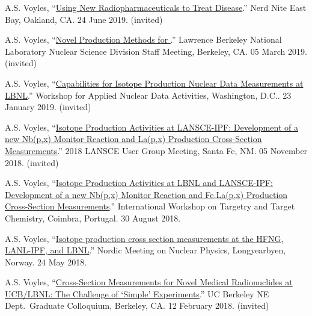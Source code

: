 \begin{bibsection}
\item A.S. Voyles, \enquote{\href{https://eastbay.nerdnite.com/nerd-nite-624-apollo-11-recovery-oakland-art-deco-radiopharmaceuticals/}{Using New Radiopharmaceuticals to Treat Disease}.} Nerd Nite East Bay, Oakland, CA. 24 June 2019. (invited)

\item A.S. Voyles, \enquote{\href{https://conferences.lbl.gov/event/188/}{Novel Production Methods for }.} Lawrence Berkeley National Laboratory Nuclear Science Division Staff Meeting, Berkeley, CA. 05 March 2019. (invited)

\item A.S. Voyles, \enquote{\href{https://conferences.lbl.gov/event/198/}{Capabilities for Isotope Production Nuclear Data Measurements at LBNL}.} Workshop for Applied Nuclear Data Activities, Washington, D.C.. 23 January 2019. (invited)

\item A.S. Voyles, \enquote{\href{https://lansce.lanl.gov/lug2018.php}{Isotope Production Activities at LANSCE-IPF: Development of a new Nb(p,x) Monitor Reaction and La(p,x) Production Cross-Section Measurements}.} 2018 LANSCE User Group Meeting, Santa Fe, NM. 05 November 2018. (invited)

\item A.S. Voyles, \enquote{\href{https://slideslive.com/38910297/isotope-production-activities-at-lbnl-and-lansceipf-development-of-a-new-nbpx90mo-monitor-reaction-and-felapx-production-crosssection-measurements}{Isotope Production Activities at LBNL and LANSCE-IPF: Development of a new Nb(p,x) Monitor Reaction and Fe,La(p,x) Production Cross-Section Measurements}.}  International Workshop on Targetry and Target Chemistry, Coimbra, Portugal. 30 August 2018.


\item A.S. Voyles, \enquote{\href{https://indico.cern.ch/event/686407/contributions/2943775/}{Isotope production cross section measurements at the HFNG, LANL-IPF, and LBNL}.}    Nordic Meeting on Nuclear Physics, Longyearbyen, Norway. 24 May 2018.

\item A.S. Voyles, \enquote{\href{https://github.com/avoyles/presentations/blob/master/2018-02-12-UCBNE_colloquium/Voyles_12_Feb_2018_NE_Colloquium_Talk.pdf}{Cross-Section Measurements for Novel Medical Radionuclides at UCB/LBNL: The Challenge of \enquote{Simple} Experiments}.} UC Berkeley NE Dept.\ Graduate Colloquium, Berkeley, CA. 12 February 2018. (invited)


\end{bibsection}
